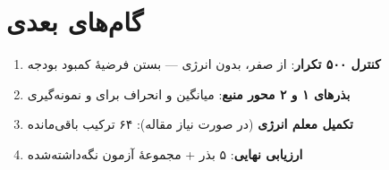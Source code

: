 \documentclass[11pt,a4paper]{article}
\begin{document}
\section{گام‌های بعدی}
\label{sec:next}

\begin{enumerate}
  \item \textbf{کنترل  ۵۰۰ تکرار}: از صفر، بدون انرژی — بستن فرضیهٔ کمبود بودجه
  \item \textbf{بذرهای ۱ و ۲ محور منبع}: میانگین و انحراف برای  و نمونه‌گیری
  \item \textbf{تکمیل معلم انرژی} (در صورت نیاز مقاله): ۶۴ ترکیب باقی‌مانده
  \item \textbf{ارزیابی نهایی}: ۵ بذر + مجموعهٔ آزمون نگه‌داشته‌شده
\end{enumerate}
\end{document}
